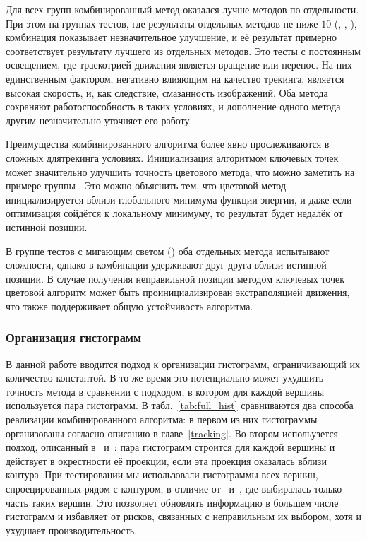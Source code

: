 
Для всех групп комбинированный метод оказался лучше методов по отдельности.
При этом на группах тестов, где результаты отдельных методов не ниже $10$
(, , ), комбинация показывает незначительное улучшение, и её результат
примерно соответствует результату лучшего из отдельных методов.
Это тесты с постоянным освещением, где траекотрией движения является вращение
или перенос.
На них единственным фактором, негативно влияющим на качество трекинга, является
высокая скорость, и, как следствие, смазанность изображений.
Оба метода сохраняют работоспособность в таких условиях, и дополнение одного
метода другим незначительно уточняет его работу.

Преимущества комбинированного алгоритма более явно прослеживаются в сложных
длятрекинга условиях.
Инициализация алгоритмом ключевых точек может значительно улучшить точность
цветового метода, что можно заметить на примере группы .
Это можно объяснить тем, что цветовой метод инициализируется вблизи глобального
минимума функции энергии, и даже если оптимизация сойдётся к локальному
минимуму, то результат будет недалёк от истинной позиции.

В группе тестов с мигающим светом () оба отдельных метода
испытывают сложности, однако в комбинации удерживают друг друга вблизи
истинной позиции.
В случае получения неправильной позиции методом ключевых точек цветовой
алгоритм может быть проинициализирован экстраполяцией движения, что также
поддерживает общую устойчивость алгоритма.



\subsubsection{Организация гистограмм}

В данной работе вводится подход к организации гистограмм, ограничивающий их
количество константой.
В то же время это потенциально может ухудшить точность метода в сравнении с
подходом, в котором для каждой вершины используется пара гистограмм.
В табл.~\ref{tab:full_hist} сравниваются два способа реализации
комбинированного алгоритма: в первом из них гистограммы организованы согласно
описанию в главе~\ref{tracking}.
Во втором испольузется подход, описанный в~\cite{Tjaden2017}
и~\cite{Tjaden2018}: пара гистограмм строится для каждой вершины и действует в
окрестности её проекции, если эта проекция оказалась вблизи контура.
При тестировании мы использовали гистограммы всех вершин, спроецированных рядом
с контуром, в отличие от~\cite{Tjaden2017} и~\cite{Tjaden2018}, где выбиралась
только часть таких вершин.
Это позволяет обновлять информацию в большем числе гистограмм и избавляет от
рисков, связанных с неправильным их выбором, хотя и ухудшает
производительность.

